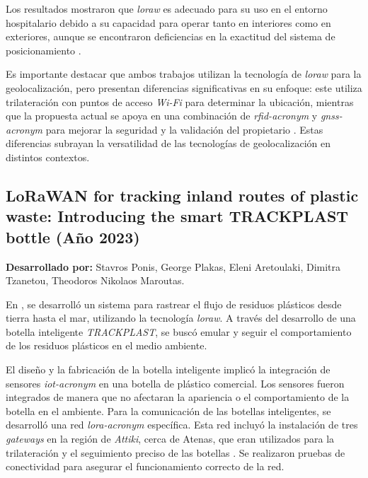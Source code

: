Los resultados mostraron que \textit{\acrshort{loraw}} es adecuado para su uso en el entorno hospitalario debido a su capacidad para operar tanto en interiores como en exteriores, aunque se encontraron deficiencias en la exactitud del sistema de posicionamiento \cite{SkepplandHole2021}. 

Es importante destacar que ambos trabajos utilizan la tecnología de \textit{\acrshort{loraw}} para la geolocalización, pero presentan diferencias significativas en su enfoque: este utiliza trilateración con puntos de acceso \textit{Wi-Fi} para determinar la ubicación, mientras que la propuesta actual se apoya en una combinación de \textit{\acrshort{rfid-acronym}} y \textit{\gls{gnss-acronym}} para mejorar la seguridad y la validación del propietario \cite{SkepplandHole2021}. Estas diferencias subrayan la versatilidad de las tecnologías de geolocalización en distintos contextos.

\subsection{LoRaWAN for tracking inland routes of plastic waste: Introducing the smart TRACKPLAST bottle (Año 2023)}
\textbf{Desarrollado por:} Stavros Ponis, George Plakas, Eleni Aretoulaki, Dimitra Tzanetou, Theodoros Nikolaos Maroutas.

En \cite{Ponis2023}, se desarrolló un sistema para rastrear el flujo de residuos plásticos desde tierra hasta el mar, utilizando la tecnología \textit{\acrshort{loraw}}. A través del desarrollo de una botella inteligente \textit{TRACKPLAST}, se buscó emular y seguir el comportamiento de los residuos plásticos en el medio ambiente.

El diseño y la fabricación de la botella inteligente implicó la integración de sensores \textit{\acrshort{iot-acronym}} en una botella de plástico comercial. Los sensores fueron integrados de manera que no afectaran la apariencia o el comportamiento de la botella en el ambiente. Para la comunicación de las botellas inteligentes, se desarrolló una red \textit{\acrshort{lora-acronym}} específica. Esta red incluyó la instalación de tres \textit{gateways} en la región de \textit{Attiki}, cerca de Atenas, que eran utilizados para la trilateración y el seguimiento preciso de las botellas \cite{Ponis2023}. Se realizaron pruebas de conectividad para asegurar el funcionamiento correcto de la red.

